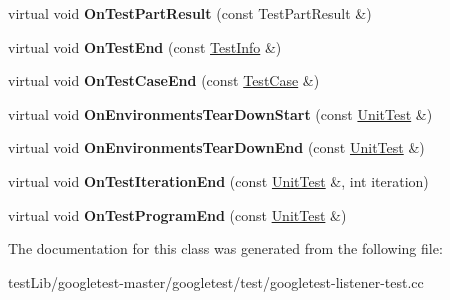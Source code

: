 \begin{DoxyCompactItemize}
virtual void {\bfseries On\+Test\+Part\+Result} (const Test\+Part\+Result \&)
\item 
\mbox{\label{classtesting_1_1internal_1_1EventRecordingListener_adb076f145cc20d9b27441b9c75da4b81}} 
virtual void {\bfseries On\+Test\+End} (const \hyperlink{classtesting_1_1TestInfo}{Test\+Info} \&)
\item 
\mbox{\label{classtesting_1_1internal_1_1EventRecordingListener_a4d0cb8a389c7339bce0aa6128291529f}} 
virtual void {\bfseries On\+Test\+Case\+End} (const \hyperlink{classtesting_1_1TestCase}{Test\+Case} \&)
\item 
\mbox{\label{classtesting_1_1internal_1_1EventRecordingListener_a17eebd7bb5cc6bab53b20794919ca5ae}} 
virtual void {\bfseries On\+Environments\+Tear\+Down\+Start} (const \hyperlink{classtesting_1_1UnitTest}{Unit\+Test} \&)
\item 
\mbox{\label{classtesting_1_1internal_1_1EventRecordingListener_acd5a3dc070265166a7da68222031fd61}} 
virtual void {\bfseries On\+Environments\+Tear\+Down\+End} (const \hyperlink{classtesting_1_1UnitTest}{Unit\+Test} \&)
\item 
\mbox{\label{classtesting_1_1internal_1_1EventRecordingListener_ab0cc007bcfaf06cd383d574c88f62aea}} 
virtual void {\bfseries On\+Test\+Iteration\+End} (const \hyperlink{classtesting_1_1UnitTest}{Unit\+Test} \&, int iteration)
\item 
\mbox{\label{classtesting_1_1internal_1_1EventRecordingListener_a21fe9c3c519c4599a48b16ddfb734aa3}} 
virtual void {\bfseries On\+Test\+Program\+End} (const \hyperlink{classtesting_1_1UnitTest}{Unit\+Test} \&)
\end{DoxyCompactItemize}


The documentation for this class was generated from the following file\+:\begin{DoxyCompactItemize}
\item 
test\+Lib/googletest-\/master/googletest/test/googletest-\/listener-\/test.\+cc\end{DoxyCompactItemize}
